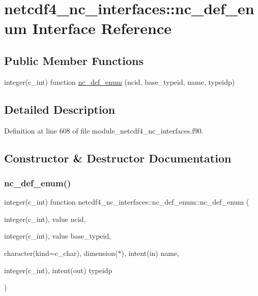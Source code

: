 \hypertarget{interfacenetcdf4__nc__interfaces_1_1nc__def__enum}{}\section{netcdf4\+\_\+nc\+\_\+interfaces\+:\+:nc\+\_\+def\+\_\+enum Interface Reference}
\label{interfacenetcdf4__nc__interfaces_1_1nc__def__enum}
\subsection*{Public Member Functions}
\begin{DoxyCompactItemize}
\item 
integer(c\+\_\+int) function \hyperlink{interfacenetcdf4__nc__interfaces_1_1nc__def__enum_aba5fbd3bca9a2dd052c6a7d97472af3a}{nc\+\_\+def\+\_\+enum} (ncid, base\+\_\+typeid, name, typeidp)
\end{DoxyCompactItemize}


\subsection{Detailed Description}


Definition at line 608 of file module\+\_\+netcdf4\+\_\+nc\+\_\+interfaces.\+f90.



\subsection{Constructor \& Destructor Documentation}
\mbox{\label{interfacenetcdf4__nc__interfaces_1_1nc__def__enum_aba5fbd3bca9a2dd052c6a7d97472af3a}} 
\subsubsection{\texorpdfstring{nc\+\_\+def\+\_\+enum()}{nc\_def\_enum()}}
{\footnotesize\ttfamily integer(c\+\_\+int) function netcdf4\+\_\+nc\+\_\+interfaces\+::nc\+\_\+def\+\_\+enum\+::nc\+\_\+def\+\_\+enum (\begin{DoxyParamCaption}\item[{integer(c\+\_\+int), value}]{ncid,  }\item[{integer(c\+\_\+int), value}]{base\+\_\+typeid,  }\item[{character(kind=c\+\_\+char), dimension($\ast$), intent(in)}]{name,  }\item[{integer(c\+\_\+int), intent(out)}]{typeidp }\end{DoxyParamCaption})}



